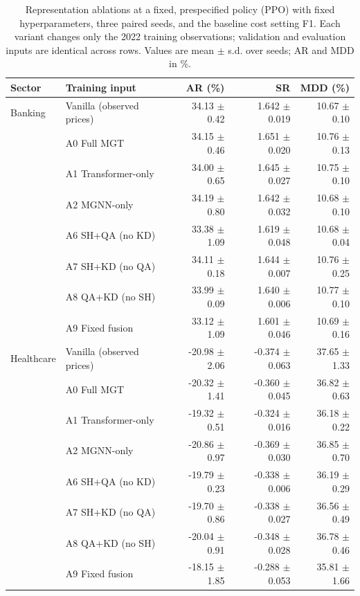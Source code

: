 \begin{table}[!t]\centering\small\color{blue}
\caption{Representation ablations at a fixed, prespecified policy (PPO) with fixed hyperparameters, three paired seeds, and the baseline cost setting F1. Each variant changes only the 2022 training observations; validation and evaluation inputs are identical across rows. Values are mean $\pm$ s.d. over seeds; AR and MDD in \%.}
\label{tab:ablation_ppo}
\begin{tabular}{llrrr}\toprule
Sector & Training input & AR (\%) & SR & MDD (\%) \\ \midrule
Banking & Vanilla (observed prices) & 34.13 $\pm$ 0.42 & 1.642 $\pm$ 0.019 & 10.67 $\pm$ 0.10 \\
 & A0 Full MGT & 34.15 $\pm$ 0.46 & 1.651 $\pm$ 0.020 & 10.76 $\pm$ 0.13 \\
 & A1 Transformer-only & 34.00 $\pm$ 0.65 & 1.645 $\pm$ 0.027 & 10.75 $\pm$ 0.10 \\
 & A2 MGNN-only & 34.19 $\pm$ 0.80 & 1.642 $\pm$ 0.032 & 10.68 $\pm$ 0.10 \\
 & A6 SH+QA (no KD) & 33.38 $\pm$ 1.09 & 1.619 $\pm$ 0.048 & 10.68 $\pm$ 0.04 \\
 & A7 SH+KD (no QA) & 34.11 $\pm$ 0.18 & 1.644 $\pm$ 0.007 & 10.76 $\pm$ 0.25 \\
 & A8 QA+KD (no SH) & 33.99 $\pm$ 0.09 & 1.640 $\pm$ 0.006 & 10.77 $\pm$ 0.10 \\
 & A9 Fixed fusion & 33.12 $\pm$ 1.09 & 1.601 $\pm$ 0.046 & 10.69 $\pm$ 0.16 \\
\midrule
Healthcare & Vanilla (observed prices) & -20.98 $\pm$ 2.06 & -0.374 $\pm$ 0.063 & 37.65 $\pm$ 1.33 \\
 & A0 Full MGT & -20.32 $\pm$ 1.41 & -0.360 $\pm$ 0.045 & 36.82 $\pm$ 0.63 \\
 & A1 Transformer-only & -19.32 $\pm$ 0.51 & -0.324 $\pm$ 0.016 & 36.18 $\pm$ 0.22 \\
 & A2 MGNN-only & -20.86 $\pm$ 0.97 & -0.369 $\pm$ 0.030 & 36.85 $\pm$ 0.70 \\
 & A6 SH+QA (no KD) & -19.79 $\pm$ 0.23 & -0.338 $\pm$ 0.006 & 36.19 $\pm$ 0.29 \\
 & A7 SH+KD (no QA) & -19.70 $\pm$ 0.86 & -0.338 $\pm$ 0.027 & 36.56 $\pm$ 0.49 \\
 & A8 QA+KD (no SH) & -20.04 $\pm$ 0.91 & -0.348 $\pm$ 0.028 & 36.78 $\pm$ 0.46 \\
 & A9 Fixed fusion & -18.15 $\pm$ 1.85 & -0.288 $\pm$ 0.053 & 35.81 $\pm$ 1.66 \\
\bottomrule
\end{tabular}\end{table}